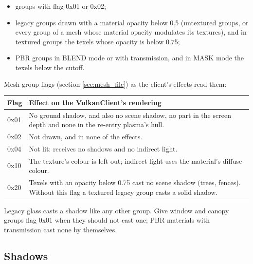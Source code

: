 \documentclass[Orbiter Developer Manual.tex]{subfiles}
\begin{document}
\begin{sloppypar}
\begin{itemize}
\item groups with flag 0x01 or 0x02;
\item legacy groups drawn with a material opacity below 0.5 (untextured groups, or every group of a mesh whose material opacity modulates its textures), and in textured groups the texels whose opacity is below 0.75;
\item PBR groups in BLEND mode or with transmission, and in MASK mode the texels below the cutoff.
\end{itemize}

\noindent
Mesh group flags (section \ref{sec:mesh_file}) as the client's effects read them:

	\begin{longtable}{ |p{}|p{}| }
	\hline\rule{0pt}{2ex}
	\textbf{Flag} & \textbf{Effect on the VulkanClient's rendering}\\
	\hline\rule{0pt}{2ex}
	0x01 & No ground shadow, and also no scene shadow, no part in the screen depth and none in the re-entry plasma's hull.\\
	\hline\rule{0pt}{2ex}
	0x02 & Not drawn, and in none of the effects.\\
	\hline\rule{0pt}{2ex}
	0x04 & Not lit: receives no shadows and no indirect light.\\
	\hline\rule{0pt}{2ex}
	0x10 & The texture's colour is left out; indirect light uses the material's diffuse colour.\\
	\hline\rule{0pt}{2ex}
	0x20 & Texels with an opacity below 0.75 cast no scene shadow (trees, fences). Without this flag a textured legacy group casts a solid shadow.\\
	\hline
	\end{longtable}

\noindent
Legacy glass casts a shadow like any other group. Give window and canopy groups flag 0x01 when they should not cast one; PBR materials with transmission cast none by themselves.


\subsection{Shadows}
\label{ssec:vk_shadows}


\end{sloppypar}
\end{document}
